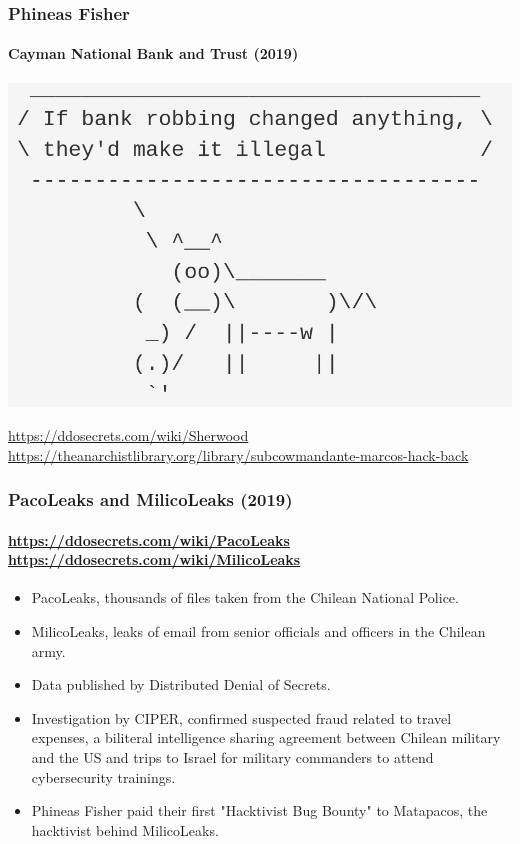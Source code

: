 \documentclass[aspectratio=169,usenames,dvipsnames]{beamer}
\begin{document}
\begin{frame}[c]
  \frametitle{Phineas Fisher}
  \framesubtitle{Cayman National Bank and Trust (2019)}

  \centering
  \includegraphics[width=\textwidth,height=0.4\textheight,keepaspectratio]{img/hackback_sherwood.png}

  \vspace{5mm}

  \footnotesize
  \url{https://ddosecrets.com/wiki/Sherwood}\\
  \url{https://theanarchistlibrary.org/library/subcowmandante-marcos-hack-back}

\end{frame}

\begin{frame}
  \frametitle{PacoLeaks and MilicoLeaks (2019)}
  \framesubtitle{\url{https://ddosecrets.com/wiki/PacoLeaks} \url{https://ddosecrets.com/wiki/MilicoLeaks}}

  \begin{itemize}[<+->]
    \item PacoLeaks, thousands of files taken from the Chilean National
      Police.
    \item MilicoLeaks, leaks of email from senior officials and officers in
      the Chilean army.
    \item Data published by Distributed Denial of Secrets.
    \item Investigation by CIPER, confirmed suspected fraud related to travel
      expenses, a biliteral intelligence sharing agreement between Chilean
      military and the US and trips to Israel for military commanders to
      attend cybersecurity trainings.
    \item Phineas Fisher paid their first "Hacktivist Bug Bounty" to
      Matapacos, the hacktivist behind MilicoLeaks.
  \end{itemize}
\end{frame}
\end{document}

